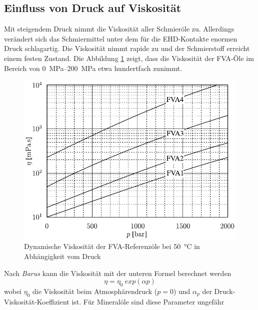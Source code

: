 \subsection*{Einfluss von Druck auf Viskosität}
\label{sub:einfluss_von_druck_auf_viskositaet}
Mit steigendem Druck nimmt die Viskosität aller Schmieröle zu.
Allerdings verändert sich das Schmiermittel unter dem für die EHD-Kontakte enormen Druck schlagartig.
Die Viskosität nimmt rapide zu und der Schmierstoff erreicht einem festen Zustand.
Die Abbildung \ref{fig:dynamische_viskositaet_in_abhaengigkeit_vom_druck} zeigt, dass die Viskosität der FVA-Öle im Bereich von \SIrange{0}{200}{\mega\pascal} etwa hundertfach zunimmt.
\begin{figure}[htb]
    \centering
    \includegraphics[]{./images/viskositaet_druck.pdf}
    \caption{Dynamische Viskosität der FVA-Referenzöle bei \SI{50}{\degreeCelsius} in Abhängigkeit vom Druck \cite{schilling_1985}}
    \label{fig:dynamische_viskositaet_in_abhaengigkeit_vom_druck}
\end{figure}
%

Nach \textit{Barus} \cite{cameron_1966} kann die Viskosität mit der unteren Formel berechnet werden
\begin{equation}
    \eta = \eta_0 \ exp(\alpha p)
    \label{eq:dynamische_viskositaet_druck_barus}
\end{equation}
%
wobei $\eta_0$ die Viskosität beim Atmosphärendruck ($p =  0$) und $\alpha_p$ der Druck-Viskosität-Koeffizient  ist.
Für Mineralöle sind diese Parameter ungefähr

